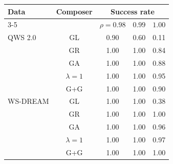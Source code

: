 \begin{tabular}{lcccc}
\toprule
Data & Composer & \multicolumn{3}{c}{Success rate} \\
\cmidrule(lr){3-5}
 & & $\rho=0.98$ & $0.99$ & $1.00$ \\
\midrule
QWS 2.0 & GL & 0.90 & 0.60 & 0.11 \\
 & GR & 1.00 & 1.00 & 0.84 \\
 & GA & 1.00 & 1.00 & 0.88 \\
 & $\lambda=1$ & 1.00 & 1.00 & 0.95 \\
 & G+G & 1.00 & 1.00 & 0.90 \\
\midrule
WS-DREAM & GL & 1.00 & 1.00 & 0.38 \\
 & GR & 1.00 & 1.00 & 1.00 \\
 & GA & 1.00 & 1.00 & 0.96 \\
 & $\lambda=1$ & 1.00 & 1.00 & 0.97 \\
 & G+G & 1.00 & 1.00 & 1.00 \\
\bottomrule
\end{tabular}
